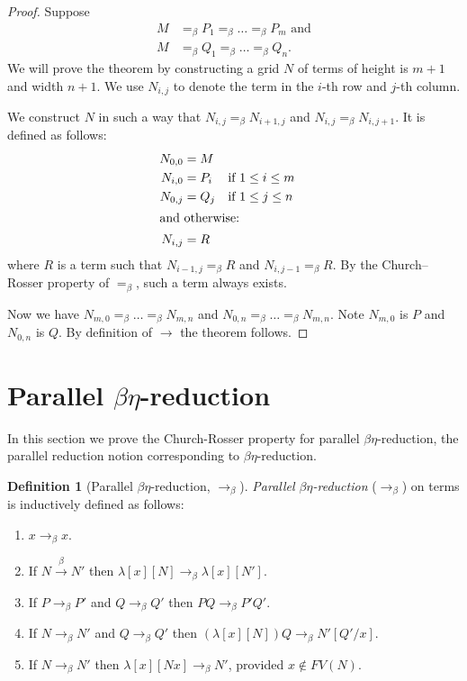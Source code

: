 \documentclass[10pt,a4paper]{article}
\theoremstyle{plain}
\theoremstyle{definition}
\newtheorem{defn}[thm]{Definition}
\theoremstyle{remark}
\newcommand*{\olfileid}[3]{}
\newcommand*{\olsection}[1]{\section*{#1}}
\newcommand*{\ollabel}[1]{\label{#1}}
\providecommand{\Subst}[3]{#1[#2/#3]}
\providecommand{\lambd}{\ensuremath{\lambda}}
\providecommand{\beredpar}{\mathrel{\rightarrow_\beta}}
\providecommand{\xredone}{\mathrel{=_\beta}}
\providecommand{\xred}{\mathrel{\rightarrow}}
\begin{document}
\begin{proof}
  Suppose 
  \begin{align*}
    M & \xredone P_1 \xredone \dots \xredone P_m \text{ and}\\
    M & \xredone Q_1 \xredone \dots \xredone Q_n.
  \end{align*}
  We will prove the theorem by constructing a grid $N$ of terms of
  height is $m + 1$ and width $n + 1$. We use $N_{i,j}$ to denote the
  term in the $i$-th row and $j$-th column.
  
  We construct $N$ in such a way that $N_{i,j} \xredone N_{i+1,j}$ and
  $N_{i,j} \xredone N_{i,j+1}$. It is defined as follows:
  \begin{align*}
    N_{0,0} &= M \\
    N_{i,0} &= P_i && \text{if } 1 \le i \le m \\
    N_{0,j} &= Q_j && \text{if } 1 \le j \le n \\
  \intertext{and otherwise:}
    N_{i,j} &= R
  \end{align*}
  where $R$ is a term such that $N_{i-1,j} \xredone R$ and $N_{i,j-1}
  \xredone R$. By the Church--Rosser property of $\xredone$, such a
  term always exists.

  Now we have $N_{m,0} \xredone \dots \xredone N_{m,n}$ and $N_{0,n}
  \xredone \dots \xredone N_{m,n}$. Note $N_{m,0}$ is $P$ and $N_{0,n}$
  is $Q$. By definition of $\xred$ the theorem follows.
\end{proof}





\olfileid{lam}{cr}{pbe}

\olsection{Parallel $\beta\eta$-reduction}

In this section we prove the Church-Rosser property for parallel
$\beta\eta$-reduction, the parallel reduction notion corresponding to
$\beta\eta$-reduction. 

\begin{defn}[Parallel $\beta\eta$-reduction, $\beredpar$] \ollabel{defn:beredpar}
  \emph{Parallel $\beta\eta$-reduction} ($\beredpar$) on terms is
  inductively defined as follows:
  \begin{enumerate}
    \item \ollabel{defn:beredpar1} $x \beredpar x$.
    \item \ollabel{defn:beredpar2} If $N \xrightarrow{\beta} N'$ then $\lambd[x][N] \beredpar
      \lambd[x][N']$.
    \item \ollabel{defn:beredpar3} If $P \beredpar P'$ and $Q \beredpar Q'$ then $PQ \beredpar
      P'Q'$.
    \item \ollabel{defn:beredpar4} If $N \beredpar N'$ and $Q \beredpar Q'$ then
      $(\lambd[x][N])Q \beredpar \Subst{N'}{Q'}{x}$.
    \item \ollabel{defn:beredpar5} If $N \beredpar N'$ then $\lambd[x][Nx]
      \beredpar N'$, provided $x \notin FV(N)$.
  \end{enumerate}
\end{defn}
\end{document}
